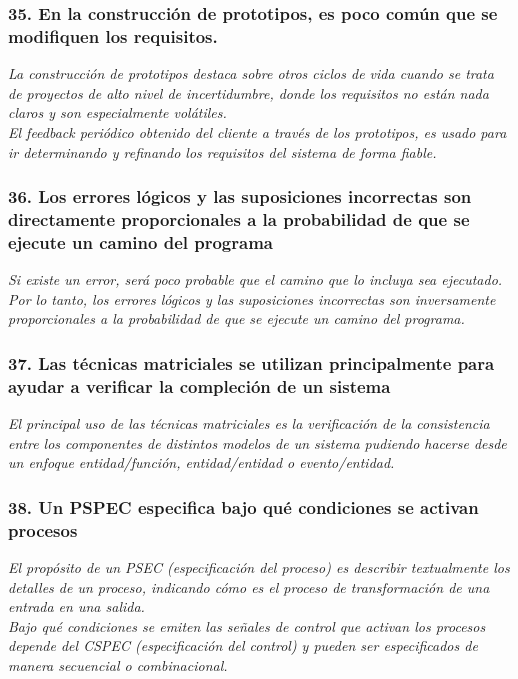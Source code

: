 \subsubsection*{35. En la construcción de prototipos, es poco común que se modifiquen los requisitos.}
\textit{La construcción de prototipos destaca sobre otros ciclos de vida cuando se trata de proyectos de alto nivel de incertidumbre, donde los requisitos no están nada claros y son especialmente volátiles.\\
El feedback periódico obtenido del cliente a través de los prototipos, es usado para ir determinando y refinando los requisitos del sistema de forma fiable.}

\subsubsection*{36. Los errores lógicos y las suposiciones incorrectas son directamente proporcionales a la probabilidad de que se ejecute un camino del programa}
\textit{Si existe un error, será poco probable que el camino que lo incluya sea ejecutado. Por lo tanto, los errores lógicos y las suposiciones incorrectas son inversamente proporcionales a la probabilidad de que se ejecute un camino del programa.
}

\subsubsection*{37. Las técnicas matriciales se utilizan principalmente para ayudar a verificar la compleción de un sistema}
\textit{El principal uso de las técnicas matriciales es la verificación de la consistencia entre los componentes de distintos modelos de un sistema pudiendo hacerse desde un enfoque entidad/función, entidad/entidad o evento/entidad.
}

\subsubsection*{38. Un PSPEC especifica bajo qué condiciones se activan procesos}
\textit{El propósito de un PSEC (especificación del proceso) es describir textualmente los detalles de un proceso, indicando cómo es el proceso de transformación de una entrada en una salida.
\\
Bajo qué condiciones se emiten las señales de control que activan los procesos depende del CSPEC (especificación del control) y pueden ser especificados de manera secuencial o combinacional.
}


